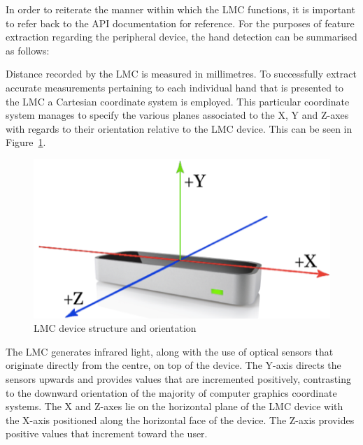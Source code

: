 In order to reiterate the manner within which the LMC functions, it is important to refer back to the API documentation for reference. For the purposes of feature extraction regarding the peripheral device, the hand detection can be summarised as follows:

Distance recorded by the LMC is measured in millimetres. 
To successfully extract accurate measurements pertaining to each individual hand that is presented to the LMC a Cartesian coordinate system is employed. 	This particular coordinate system manages to specify the various planes associated to the X, Y and Z-axes with regards to their orientation relative to the LMC device. This can be seen in Figure~\ref{fig:LMC device structure and orientation}. 

    
    \begin{figure}[htbp!] 
    \centering    
    \includegraphics[width=1.0\textwidth]{Chapter3/Figs/Figure3-5.png}
    \caption[LMC device structure and orientation]{LMC device structure and orientation}
    \label{fig:LMC device structure and orientation}
    \end{figure}


The LMC generates infrared light, along with the use of optical sensors that originate directly from the centre, on top of the device. The Y-axis directs the sensors upwards and provides values that are incremented positively, contrasting to the downward orientation of the majority of computer graphics coordinate systems. The X and Z-axes lie on the horizontal plane of the LMC device with the X-axis positioned along the horizontal face of the device. The Z-axis provides positive values that increment toward the user. 


